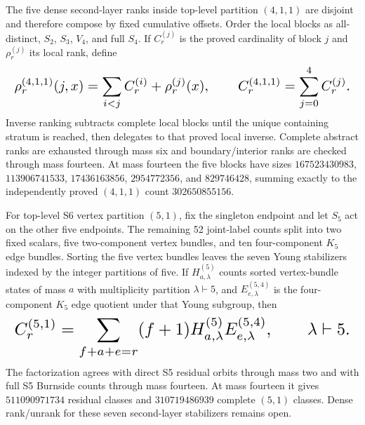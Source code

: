 \documentclass{article}
\newcommand{\fitmath}[1]{\resizebox{0.99\linewidth}{!}{$\displaystyle #1$}}
\begin{document}
The five dense second-layer ranks inside top-level partition $(4,1,1)$ are
disjoint and therefore compose by fixed cumulative offsets. Order the local
blocks as all-distinct, $S_2$, $S_3$, $V_4$, and full $S_4$. If
$C_r^{(j)}$ is the proved cardinality of block $j$ and $\rho_r^{(j)}$ its local
rank, define
\begin{equation}
  \fitmath{%
    \rho_r^{(4,1,1)}(j,x)=
      \sum_{i<j}C_r^{(i)}+\rho_r^{(j)}(x),
    \qquad
    C_r^{(4,1,1)}=\sum_{j=0}^{4}C_r^{(j)}.
  }
  \label{eq:optimization-crazy-sextuple-s6-s4-complete-ranking}
\end{equation}
Inverse ranking subtracts complete local blocks until the unique containing
stratum is reached, then delegates to that proved local inverse. Complete
abstract ranks are exhausted through mass six and boundary/interior ranks are
checked through mass fourteen. At mass fourteen the five blocks have sizes
$167523430983$, $113906741533$, $17436163856$, $2954772356$, and $829746428$,
summing exactly to the independently proved $(4,1,1)$ count
$302650855156$.

For top-level S6 vertex partition $(5,1)$, fix the singleton endpoint and let
$S_5$ act on the other five endpoints. The remaining 52 joint-label counts
split into two fixed scalars, five two-component vertex bundles, and ten
four-component $K_5$ edge bundles. Sorting the five vertex bundles leaves the
seven Young stabilizers indexed by the integer partitions of five. If
$H_{a,\lambda}^{(5)}$ counts sorted vertex-bundle states of mass $a$ with
multiplicity partition $\lambda\vdash5$, and $E_{e,\lambda}^{(5,4)}$ is the
four-component $K_5$ edge quotient under that Young subgroup, then
\begin{equation}
  \fitmath{%
    C_r^{(5,1)}=
      \sum_{f+a+e=r}(f+1)
      H_{a,\lambda}^{(5)}E_{e,\lambda}^{(5,4)},
    \qquad \lambda\vdash5.
  }
  \label{eq:optimization-crazy-sextuple-s6-s5-vertex-decomposition}
\end{equation}
The factorization agrees with direct S5 residual orbits through mass two and
with full S5 Burnside counts through mass fourteen. At mass fourteen it gives
$511090971734$ residual classes and $310719486939$ complete $(5,1)$ classes.
Dense rank/unrank for these seven second-layer stabilizers remains open.
\end{document}

